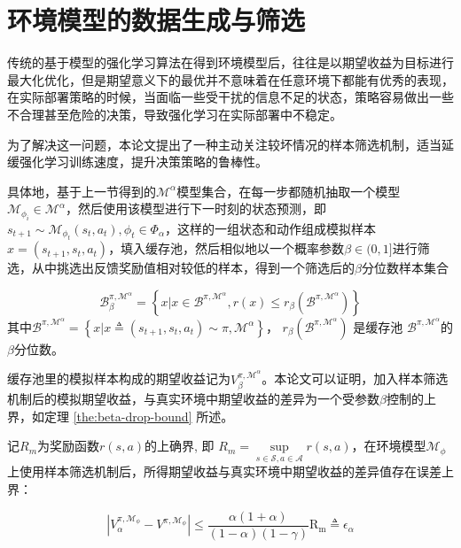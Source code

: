 \section{环境模型的数据生成与筛选}\label{sec:rollout-method}

传统的基于模型的强化学习算法在得到环境模型后，往往是以期望收益为目标进行最大化优化，但是期望意义下的最优并不意味着在任意环境下都能有优秀的表现，在实际部署策略的时候，当面临一些受干扰的信息不足的状态，策略容易做出一些不合理甚至危险的决策，导致强化学习在实际部署中不稳定。

为了解决这一问题，本论文提出了一种主动关注较坏情况的样本筛选机制，适当延缓强化学习训练速度，提升决策策略的鲁棒性。

具体地，基于上一节得到的$\mathcal{M}^{\alpha}$模型集合，在每一步都随机抽取一个模型$\mathcal{M}_{\phi_i}\in\mathcal{M}^\alpha$，然后使用该模型进行下一时刻的状态预测，即$s_{t+1}\sim \mathcal{M}_{\phi_t}(s_t,a_t), \phi_t\in\Phi_\alpha$，这样的一组状态和动作组成模拟样本$x=\left(s_{t+1},s_t,a_t\right)$，填入缓存池，然后相似地以一个概率参数$\beta\in(0,1]$进行筛选，从中挑选出反馈奖励值相对较低的样本，得到一个筛选后的$\beta$分位数样本集合

\begin{equation}
    \mathcal{B}_\beta^{\pi,\mathcal{M}^\alpha}=\left\{x|x\in\mathcal{B}^{\pi,\mathcal{M}^\alpha},r(x)\leq r_\beta(\mathcal{B}^{\pi,\mathcal{M}^\alpha})\right\}
\end{equation}
其中$\mathcal{B}^{\pi,\mathcal{M}^\alpha}=\left\{x|x\triangleq\left(s_{t+1},s_t,a_t\right)\sim\pi,\mathcal{M}^\alpha\right\}$， $r_\beta(\mathcal{B}^{\pi,\mathcal{M}^\alpha})$ 是缓存池 $\mathcal{B}^{\pi,\mathcal{M}^\alpha}$的$\beta$分位数。

缓存池里的模拟样本构成的期望收益记为${V}^{\pi,\mathcal{M}^\alpha}_\beta$。本论文可以证明，加入样本筛选机制后的模拟期望收益，与真实环境中期望收益的差异为一个受参数$\beta$控制的上界，如定理 \ref{the:beta-drop-bound} 所述。

\begin{theorem}\label{the:beta-drop-bound}

记$R_{m}$为奖励函数$r(s,a)$的上确界, 即 $R_{m}=\underset{s\in\mathcal{S},a\in\mathcal{A}}{\sup}r(s,a)$，在环境模型$\mathcal{M}_\phi$上使用样本筛选机制后，所得期望收益与真实环境中期望收益的差异值存在误差上界：

\begin{equation}
    |{V}_\alpha^{\pi, \mathcal{M}_{\phi}} - {V}^{\pi,\mathcal{M}_{\phi}}| \leq \frac{\alpha(1+\alpha)}{(1-\alpha)(1-\gamma)}\mathrm{R_{m}} \triangleq \epsilon_\alpha
\label{eq:eps-beta}
\end{equation}

\end{theorem}

